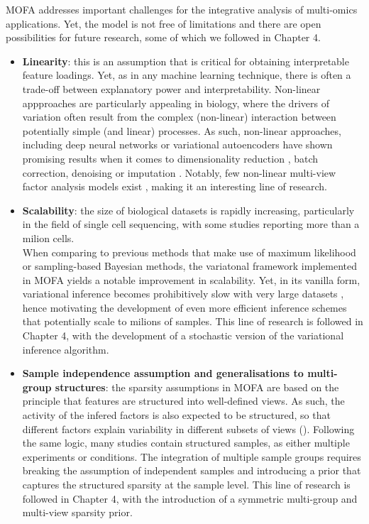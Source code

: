 MOFA addresses important challenges for the integrative analysis of multi-omics applications. Yet, the model is not free of limitations and there are open possibilities for future research, some of which we followed in Chapter 4.\\
\begin{itemize}

	\item \textbf{Linearity}: this is an assumption that is critical for obtaining interpretable feature loadings. Yet, as in any machine learning technique, there is often a trade-off between explanatory power and interpretability\cite{XX}. Non-linear appproaches are particularly appealing in biology, where the drivers of variation often result from the complex (non-linear) interaction between potentially simple (and linear) processes. As such, non-linear approaches, including deep neural networks or variational autoencoders have shown promising results when it comes to dimensionality reduction \cite{Lin2017,Ding2018,Lopez2018}, batch correction\cite{Lopez2018}, denoising \cite{Eraslan2019} or imputation \cite{Lin2016}. Notably, few non-linear multi-view factor analysis models exist \cite{Damianou2016}, making it an interesting line of research.

	\item \textbf{Scalability}: the size of biological datasets is rapidly increasing, particularly in the field of single cell sequencing, with some studies reporting more than a milion cells\cite{Svensson2018,Cao2019}. \\
	When comparing to previous methods that make use of maximum likelihood or sampling-based Bayesian methods, the variatonal framework implemented in MOFA yields a notable improvement in scalability. Yet, in its vanilla form, variational inference becomes prohibitively slow with very large datasets \cite{Hoffman2013,Blei2016,Hoffman2014}, hence motivating the development of even more efficient inference schemes that potentially scale to milions of samples. This line of research is followed in Chapter 4, with the development of a stochastic version of the variational inference algorithm.

	\item \textbf{Sample independence assumption and generalisations to multi-group structures}: the sparsity assumptions in MOFA are based on the principle that features are structured into well-defined views. As such, the activity of the infered factors is also expected to be structured, so that different factors explain variability in different subsets of views (). Following the same logic, many studies contain structured samples, as either multiple experiments or conditions. The integration of multiple sample groups requires breaking the assumption of independent samples and introducing a prior that captures the structured sparsity at the sample level. This line of research is followed in Chapter 4, with the introduction of a symmetric multi-group and multi-view sparsity prior.


\end{itemize}
